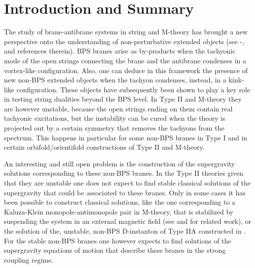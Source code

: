 \documentclass[12pt,a4paper]{article}
\begin{document}
\vspace{1cm}


\newpage

\pagestyle{plain}






\section{Introduction and Summary}


The study of brane-antibrane systems in string and M-theory has
brought a new perspective onto the understanding of 
non-perturbative extended objects (see 
\cite{Senrev}-\cite{BGrev}, and references therein).
BPS branes arise
as by-products when the tachyonic mode of the open
strings connecting the brane and the antibrane condenses in a 
vortex-like configuration. Also, one can deduce in this
framework the presence of new non-BPS extended objects 
when the tachyon condenses, instead, in a kink-like configuration.
These objects have subsequently been shown to play a key role 
in testing string dualities beyond the BPS level. 
In Type II and M-theory they are however unstable, because the open strings
ending on them contain real tachyonic excitations, but
the instability can be cured when the theory is projected out by
a certain symmetry that removes the tachyons from the 
spectrum.
This happens in particular for some non-BPS
branes in Type I
and in certain orbifold/orientifold constructions of Type
II and M-theory.

An interesting and still open problem is the construction of the 
supergravity solutions corresponding to these non-BPS branes.
In the Type II theories given that they are unstable
one does not expect to find stable classical solutions of the 
supergravity that could be associated to these branes.
Only in some cases it has been possible to construct classical solutions,
like the one corresponding to a Kaluza-Klein monopole-antimonopole
pair in M-theory, that is stabilized by suspending the system in an
external magnetic field (see \cite{Sen1} and \cite{Ro,Youm,CET,M,JM} 
for related work), or the solution of the, unstable, non-BPS D-instanton
of Type IIA constructed in \cite{HHK}. For the stable non-BPS branes
one however expects to find solutions of the supergravity equations
of motion that describe these branes in the strong coupling
regime.
\end{document}
